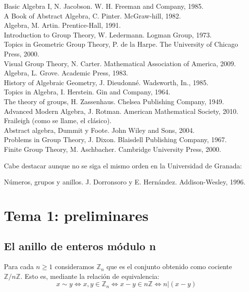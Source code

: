 \documentclass{article}
\theoremstyle{theorem-style}  %
\theoremstyle{definition-style}
\theoremstyle{example-style}
\begin{document}
Basic Algebra I, N. Jacobson. W. H. Freeman and Company, 1985.\\
A Book of Abstract Algebra, C. Pinter. McGraw-hill, 1982.\\
Algebra, M. Artin. Prentice-Hall, 1991.\\
Introduction to Group Theory, W. Ledermann. Logman Group, 1973.\\
Topics in Geometric Group Theory, P. de la Harpe. The University of Chicago Press, 2000.\\
Visual Group Theory, N. Carter. Mathematical Association of America, 2009.\\
Algebra, L. Grove. Academic Press, 1983.\\
History of Algebraic Geometry, J. Dieudonné. Wadsworth, In., 1985.\\
Topics in Algebra, I. Herstein. Gin and Company, 1964.\\
The theory of groups, H. Zassenhaus. Chelsea Publishing Company, 1949.\\
Advanced Modern Algebra, J. Rotman. American Mathematical Society, 2010.\\
Fraileigh (como se llame, el clásico).\\
Abstract algebra, Dummit y Foote. John Wiley and Sons, 2004.\\
Problems in Group Theory, J. Dixon. Blaisdell Publishing Company, 1967.\\
Finite Group Theory, M. Aschbacher. Cambridge University Press, 2000.

Cabe destacar aunque no se siga el mismo orden en la Universidad de Granada:

Números, grupos y anillos. J. Dorronsoro y E. Hernández. Addison-Wesley, 1996.

\newpage

\section{Tema 1: preliminares}

\subsection{El anillo de enteros módulo n}

Para cada $n \ge 1$ consideramos $\mathbb{Z}_n$ que es el conjunto obtenido como cociente $\mathbb{Z}/n\mathbb{Z}$. Esto es, mediante la relación de equivalencia: $$x \sim y \iff x,y \in \mathbb{Z}_n \iff x-y \in n\mathbb{Z} \iff n | (x-y)$$
\end{document}
